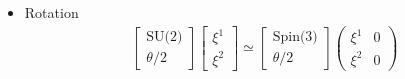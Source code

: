 \documentclass[../main.tex]{subfiles}
\begin{document}
\begin{itemize}
\begin{itemize}
\begin{align}
\begin{matrix}
\xi^1 \\
\xi^2 
\end{matrix}
\right]\simeq
\left[\begin{matrix}
\xi^1&0 \\
\xi^2&0 
\end{matrix}
\right]=\xi^1|+z\rangle+\xi^2|-z\rangle
\end{align}
Ket spinor - minimal right ideal 
\begin{align}
\langle\xi|&\rightarrow\left[\begin{matrix}
\xi^1 \\
\xi^2 
\end{matrix}
\right]^\dagger=[{\xi^1}^*\;{\xi^2}^*]
\simeq
\left[\begin{matrix}
\xi^1&0 \\
\xi^2&0 
\end{matrix}
\right]^\dagger=
\left[\begin{matrix}
{\xi^1}^*&{\xi^2}^* \\
0 & 0 
\end{matrix}
\right]\\
\langle\xi|&={\xi^1}^*\langle+z|+{\xi^2}^*\langle-z|\\
\langle\xi|=|\xi\rangle^\dagger&=(\xi^1|+z\rangle+\xi^2|-z\rangle)^\dagger\\
&={\xi^1}^*|+z\rangle^\dagger+{\xi^2}^*|-z\rangle^\dagger\\
\end{align}

\item Rotation
\begin{align}
\left[\begin{matrix}
\text{SU(2)} \\
\theta/2
\end{matrix}
\right]\left[\begin{matrix}
\xi^1 \\
\xi^2 
\end{matrix}
\right]
\simeq
\left[\begin{matrix}
\text{Spin(3)} \\
\theta/2
\end{matrix}
\right]\left(\begin{matrix}
\xi^1 & 0\\
\xi^2 & 0
\end{matrix}
\right)
\end{align}
\end{itemize}





\end{itemize}
\end{document}
